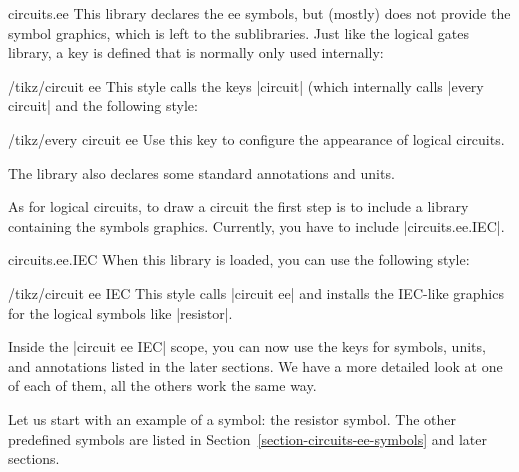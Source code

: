 \begin{tikzlibrary}{circuits.ee}
    This library declares the ee symbols, but (mostly) does not provide the
    symbol graphics, which is left to the sublibraries. Just like the logical
    gates library, a key is defined that is normally only used internally:
    \begin{key}{/tikz/circuit ee}
        This style calls the keys |circuit| (which internally calls
        |every circuit| and the following style:
        \begin{stylekey}{/tikz/every circuit ee}
            Use this key to configure the appearance of logical circuits.
        \end{stylekey}
    \end{key}

    The library also declares some standard annotations and units.
\end{tikzlibrary}

As for logical circuits, to draw a circuit the first step is to include a
library containing the symbols graphics. Currently, you have to include
|circuits.ee.IEC|.

\begin{tikzlibrary}{circuits.ee.IEC}
    When this library is loaded, you can use the following style:
    \begin{key}{/tikz/circuit ee IEC}
        This style calls |circuit ee| and installs the IEC-like graphics for
        the logical symbols like |resistor|.
    \end{key}
\end{tikzlibrary}

Inside the |circuit ee IEC| scope, you can now use the keys for symbols, units,
and annotations listed in the later sections. We have a more detailed look at
one of each of them, all the others work the same way.

Let us start with an example of a symbol: the resistor symbol. The other
predefined symbols are listed in Section~\ref{section-circuits-ee-symbols} and
later sections.

